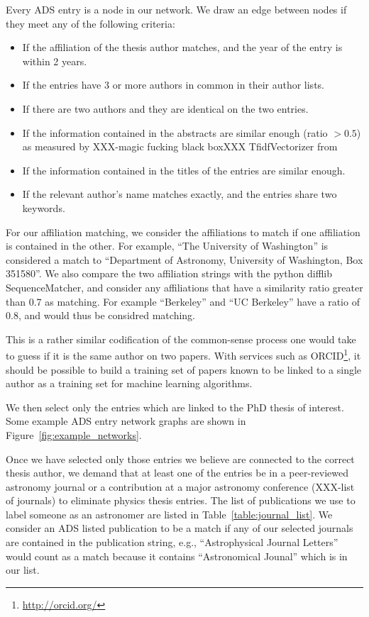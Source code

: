\documentclass{emulateapj}
\begin{document}
Every ADS entry is a node in our network. We draw an edge between nodes if they meet any of the following criteria:

\begin{itemize}
\item{If the affiliation of the thesis author matches, and the year of the entry is within 2 years.}
\item{If the entries have 3 or more authors in common in their author lists.}
\item{If there are two authors and they are identical on the two entries.}
\item{If the information contained in the abstracts are similar enough (ratio $> 0.5$) as measured by XXX-magic fucking black boxXXX TfidfVectorizer from \citet{scikit-learn}}
\item{If the information contained in the titles of the entries are similar enough.}
  \item{If the relevant author's name matches exactly, and the entries share two keywords.}
\end{itemize}

For our affiliation matching, we consider the affiliations to match if one affiliation is contained in the other.  For example, ``The University of Washington'' is considered a match to ``Department of Astronomy, University of Washington, Box 351580''.  We also compare the two affiliation strings with the python difflib SequenceMatcher, and consider any affiliations that have a similarity ratio greater than 0.7 as matching.  For example ``Berkeley'' and ``UC Berkeley'' have a ratio of 0.8, and would thus be considred matching.

This is a rather similar codification of the common-sense process one would take to guess if it is the same author on two papers. With services such as ORCID\footnote{\url{http://orcid.org/}}, it should be possible to build a training set of papers known to be linked to a single author as a training set for machine learning algorithms.  

We then select only the entries which are linked to the PhD thesis of interest.  Some example ADS entry network graphs are shown in Figure~\ref{fig:example_networks}.

Once we have selected only those entries we believe are connected to the correct thesis author, we demand that at least one of the entries be in a peer-reviewed astronomy journal or a contribution at a major astronomy conference (XXX-list of journals) to eliminate physics thesis entries.  The list of publications we use to label someone as an astronomer are listed in Table~\ref{table:journal_list}. We consider an ADS listed publication to be a match if any of our selected journals are contained in the publication string, e.g., ``Astrophysical Journal Letters'' would count as a match because it contains ``Astronomical Jounal'' which is in our list. 
\end{document}
